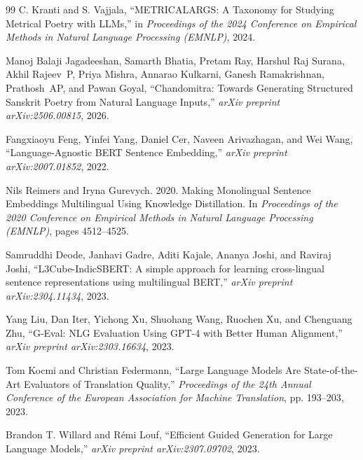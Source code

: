 \documentclass[11pt]{article}
\begin{document}
\begin{thebibliography}{99}
C. Kranti and S. Vajjala, 
``{METRICALARGS}: A Taxonomy for Studying Metrical Poetry with {LLM}s,'' 
in \textit{Proceedings of the 2024 Conference on Empirical Methods in Natural Language Processing (EMNLP)}, 2024.

Manoj Balaji Jagadeeshan, Samarth Bhatia, Pretam Ray, Harshul Raj Surana,
Akhil Rajeev~P, Priya Mishra, Annarao Kulkarni, Ganesh Ramakrishnan,
Prathosh~AP, and Pawan Goyal,
``Chandomitra: Towards Generating Structured Sanskrit Poetry from Natural
Language Inputs,''
\textit{arXiv preprint arXiv:2506.00815}, 2026.

Fangxiaoyu Feng, Yinfei Yang, Daniel Cer, Naveen Arivazhagan, and Wei Wang, 
``Language-Agnostic {BERT} Sentence Embedding,'' 
\textit{arXiv preprint arXiv:2007.01852}, 2022.

Nils Reimers and Iryna Gurevych. 2020.
\newblock Making Monolingual Sentence Embeddings Multilingual Using Knowledge Distillation.
\newblock In \textit{Proceedings of the 2020 Conference on Empirical Methods in Natural Language Processing (EMNLP)}, pages 4512--4525.

Samruddhi Deode, Janhavi Gadre, Aditi Kajale, Ananya Joshi, and Raviraj Joshi, 
``{L3Cube-IndicSBERT}: A simple approach for learning cross-lingual sentence representations using multilingual {BERT},'' 
\textit{arXiv preprint arXiv:2304.11434}, 2023.

Yang Liu, Dan Iter, Yichong Xu, Shuohang Wang, Ruochen Xu, and Chenguang Zhu, 
``{G-Eval}: {NLG} Evaluation Using {GPT-4} with Better Human Alignment,'' 
\textit{arXiv preprint arXiv:2303.16634}, 2023.

Tom Kocmi and Christian Federmann, 
``Large Language Models Are State-of-the-Art Evaluators of Translation Quality,'' 
\textit{Proceedings of the 24th Annual Conference of the European Association for Machine Translation}, pp. 193--203, 2023.

Brandon T. Willard and R{\'e}mi Louf, 
``Efficient Guided Generation for Large Language Models,'' 
\textit{arXiv preprint arXiv:2307.09702}, 2023.


\end{thebibliography}
\end{document}
